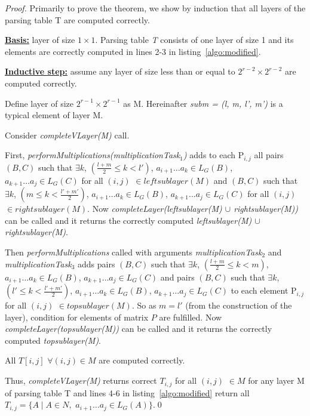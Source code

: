 \begin{proof}
Primarily to prove the theorem, we show by induction that all layers of the parsing table T are computed correctly.

\underline{\textbf{Basis:}} layer of size $1 \times 1$.
Parsing table \textit{T} consists of one layer of size 1 and its elements are correctly computed in lines 2-3 in listing~\ref{algo:modified}.

\underline{\textbf{Inductive step:}} assume any layer of size less than or equal to $2^{r - 2} \times 2^{r - 2}$ are computed correctly. 

Define layer of size $2^{r - 1} \times 2^{r - 1}$ as M. 
Hereinafter \textit{subm = (l, m, l', m')} is a typical element of layer M.

Consider \textit{completeVLayer(M)} call. 

First, \textit{performMultiplications(multiplicationTask$_1$)} adds to each P$_{i,j}$ all pairs 
$(B, C)$ such that $\exists k$, $(\frac{l+m}{2} \le k < l')$, $a_{i + 1} \dots a_{k} \in L_{G}(B)$, $a_{k + 1} \dots a_{j} \in L_{G}(C)$ for all $(i, j)$ $\in leftsublayer(M)$
and
$(B, C)$ such that $\exists k$, $(m \le k < \frac{l'+m'}{2})$, $a_{i + 1} \dots a_{k} \in L_{G}(B)$, $a_{k + 1} \dots a_{j} \in L_{G}(C)$ for all $(i, j)$ $\in rightsublayer(M)$.
Now \textit{completeLayer(leftsublayer(M) $\cup$ rightsublayer(M))} can be called and it returns the correctly computed \textit{leftsublayer(M) $\cup$ rightsublayer(M)}.

Then \textit{performMultiplications} called with arguments 
\textit{multiplicationTask$_2$} and \textit{multiplicationTask$_3$} adds pairs 
$(B, C)$ such that $\exists k$, $(\frac{l+m}{2} \le k < m)$, $a_{i + 1} \dots a_{k} \in L_{G}(B)$, $a_{k + 1} \dots a_{j} \in L_{G}(C)$ 
and pairs
$(B, C)$ such that $\exists k$, $(l' \le k < \frac{l'+m'}{2})$, $a_{i + 1} \dots a_{k} \in L_{G}(B)$, $a_{k + 1} \dots a_{j} \in L_{G}(C)$
to each element P$_{i,j}$ for all $(i, j)$ $\in topsublayer(M)$. 
So as $m = l'$ (from the construction of the layer), condition for elements of matrix $P$ are fulfilled.
Now \textit{completeLayer(topsublayer(M))} can be called and it returns the correctly computed \textit{topsublayer(M)}.

All $T[i, j]$ $\forall (i, j) \in M$ are computed correctly.

Thus, \textit{completeVLayer(M)} returns correct $T_{i, j}$ for all $(i, j)$ $\in M$ for any layer M of parsing table T and lines 4-6 in listing~\ref{algo:modified} return all $T_{i, j} =  \{ A \mid A \in N, $ $a_{i + 1} \dots a_{j} \in L_{G}(A)\}$.\qed
\end{proof}


